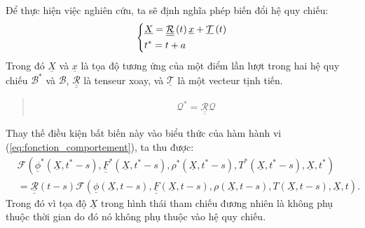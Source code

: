 \documentclass[../../../main.tex]{subfiles}
\begin{document}
	Để thực hiện việc nghiên cứu, ta sẽ định nghĩa phép biến đổi hệ quy chiếu:
		\begin{equation}
			\begin{dcases}
				\underline{X}=\underline{\underline{\mathcal{R}}}\left(t\right)\underline{x}+\underline{\mathcal{T}}\left(t\right)\\
				t^*=t+a
			\end{dcases}
		\end{equation}
	Trong đó $\underline{X}$ và $\underline{x}$ là tọa độ tương ứng của một điểm lần lượt trong hai hệ quy chiếu $\mathcal{B}^*$ và $\mathcal{B}$, $\underline{\underline{\mathcal{R}}}$ là tenseur xoay, và $\underline{\mathcal{T}}$ là một vecteur tịnh tiến.
		\begin{quotation}
				\begin{align}
					\mathcal{Q}^*=\underline{\underline{\mathcal{R}}}\mathcal{Q}
				\end{align}
		\end{quotation}
	Thay thế điều kiện bất biến này vào biểu thức của hàm hành vi (\ref{eq:fonction_comportement}), ta thu được:
		\[
			\begin{aligned}
				&\mathcal{F}\left(\underline{\phi}^*\left(\underline{X},t^*-s\right),\underline{\underline{F}}^*\left(\underline{X},t^*-s\right),\rho^*\left(\underline{X},t^*-s\right),T^*\left(\underline{X},t^*-s\right),\underline{X},t^*\right)\\
				&=\underline{\underline{\mathcal{R}}}\left(t-s\right)\mathcal{F}\left(\underline{\phi}\left(\underline{X},t-s\right),\underline{\underline{F}}\left(\underline{X},t-s\right),\rho\left(\underline{X},t-s\right),T\left(\underline{X},t-s\right),\underline{X},t\right).
			\end{aligned}
		\]
	Trong đó vì tọa độ $\underline{X}$ trong hình thái tham chiếu đương nhiên là không phụ thuộc thời gian do đó nó không phụ thuộc vào hệ quy chiếu.
\end{document}
